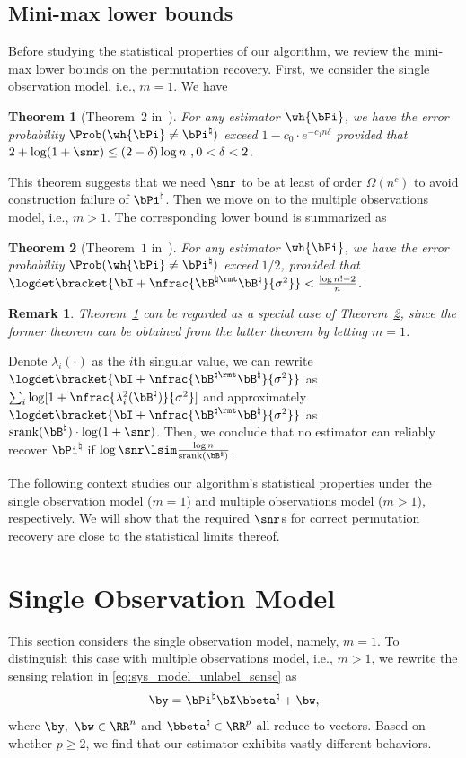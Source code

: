 \documentclass[11pt]{article}
\newtheorem{theorem}{Theorem}
\newtheorem{remark}{Remark}
\def \bPitrue {\bPi^{\natural}}
\def \bBtrue {\bB^{\natural}}
\def \bbetatrue {\bbeta^{\natural}}
\def\srank#1{\textup{srank}(#1)}
\begin{document}
\subsection{Mini-max lower bounds}
Before studying the statistical properties of
our algorithm, we review the mini-max lower bounds on the
permutation recovery.
First, we consider the single observation model, i.e.,
$m =1$. We have
\begin{theorem}[Theorem~$2$ in~\citet{pananjady2018linear}]
\label{thm:single_statis_lb}
For any estimator $\wh{\bPi}$, we have the
error probability $\Prob(\wh{\bPi}\neq \bPi^{\natural})$
exceed $1- c_0 \cdot e^{-c_1n\delta}$ provided that
$2 + \log(1 + \snr) \leq (2-\delta)\log n~,0 < \delta < 2$.
\end{theorem}
\noindent
This theorem suggests that we need $\snr$ to be at least
of order $\Omega(n^c)$ to avoid construction failure of
$\bPitrue$.
Then we move on to the multiple observations model, i.e.,
$m > 1$. The corresponding lower bound is summarized as
\begin{theorem}[Theorem~$1$ in~\citet{zhang2022permutation}]
\label{thm:multi_statis_lb}	
For any estimator $\wh{\bPi}$, we have the
error probability $\Prob(\wh{\bPi}\neq \bPi^{\natural})$ exceed
$1/2$, provided that
$\logdet\bracket{\bI + \nfrac{\bB^{\natural\rmt}\bBtrue}{\sigma^2}}  <
\frac{\log n! - 2}{n}$.
\end{theorem}
\begin{remark}
Theorem~\ref{thm:single_statis_lb} can be
regarded as a special case of Theorem~\ref{thm:multi_statis_lb}, since the former
theorem can be obtained from the latter theorem by letting
$m = 1$. 	
\end{remark}
\noindent
Denote $\lambda_i(\cdot)$ as the
$i$th singular value,
we can rewrite
$\logdet\bracket{\bI + \nfrac{\bB^{\natural\rmt}\bBtrue}{\sigma^2}}$
as  $\sum_i \log[1 + \nfrac{\lambda_i^2(\bBtrue)}{\sigma^2}]$
and approximately $\logdet\bracket{\bI + \nfrac{\bB^{\natural\rmt}\bBtrue}{\sigma^2}}$
as $\srank{\bBtrue}\cdot \log(1 + \snr)$.
Then, we conclude that no estimator can reliably recover
$\bPitrue$ if $\log \snr \lsim \frac{\log n}{\srank{\bBtrue}}$.

The following context studies our algorithm's statistical properties under the single observation model ($m = 1$) and
multiple observations model ($m > 1$), respectively.
We will show that the required
$\snr$s for correct permutation recovery are close to the statistical
limits thereof.

\section{Single Observation Model}
\label{sec:single_obser}
This section considers the single observation model, namely,
$m = 1$. To distinguish this case with multiple observations
model, i.e., $m > 1$, we rewrite the
sensing relation in \eqref{eq:sys_model_unlabel_sense} as
\begin{align}
\label{eq:single_obser_sense}
\by = \bPitrue\bX\bbetatrue + \bw,
\end{align}
where $\by,~\bw \in \RR^n$ and $\bbetatrue \in \RR^p$
all reduce to vectors.
Based on whether $p \geq 2$, we
find that our estimator exhibits vastly
different behaviors.
\end{document}
